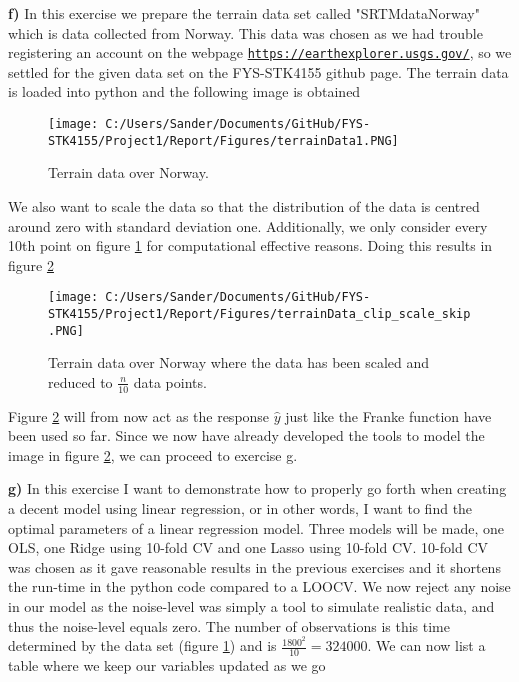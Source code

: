 \documentclass[12pt,a4paper]{article}
\begin{document}
\newpage

\noindent \textbf{f)} In this exercise we prepare the terrain data set called "SRTM\textunderscore data\textunderscore Norway" which is data collected from Norway. This data was chosen as we had trouble registering an account on the webpage \href{{https://earthexplorer.usgs.gov/}}{\nolinkurl{https://earthexplorer.usgs.gov/}}, so we settled for the given data set on the FYS-STK4155 github page. The terrain data is loaded into python and the following image is obtained

\begin{figure}[H]
\centering
\texttt{[image: C:/Users/Sander/Documents/GitHub/FYS-STK4155/Project1/Report/Figures/terrainData1.PNG]}
\caption{\label{fig:terrainData1} Terrain data over Norway.}
\end{figure}

\noindent We also want to scale the data so that the distribution of the data is centred around zero with standard deviation one. Additionally, we only consider every 10th point on figure \ref{fig:terrainData1} for computational effective reasons. Doing this results in figure \ref{fig:terrainData2}

\begin{figure}[H]
\centering
\texttt{[image: C:/Users/Sander/Documents/GitHub/FYS-STK4155/Project1/Report/Figures/terrainData\_clip\_scale\_skip.PNG]}
\caption{\label{fig:terrainData2} Terrain data over Norway where the data has been scaled and reduced to $\frac{n}{10}$ data points.}
\end{figure}

\noindent Figure \ref{fig:terrainData2} will from now act as the response $\hat{y}$ just like the Franke function have been used so far. Since we now have already developed the tools to model the image in figure \ref{fig:terrainData2}, we can proceed to exercise g.

\newpage

\noindent \textbf{g)} In this exercise I want to demonstrate how to properly go forth when creating a decent model using linear regression, or in other words, I want to find the optimal parameters of a linear regression model. Three models will be made, one OLS, one Ridge using 10-fold CV and one Lasso using 10-fold CV. 10-fold CV was chosen as it gave reasonable results in the previous exercises and it shortens the run-time in the python code compared to a LOOCV. We now reject any noise in our model as the noise-level was simply a tool to simulate realistic data, and thus the noise-level equals zero. The number of observations is this time determined by the data set (figure \ref{fig:terrainData1}) and is $\frac{1800^2}{10} = 324000$. We can now list a table where we keep our variables updated as we go
\end{document}
